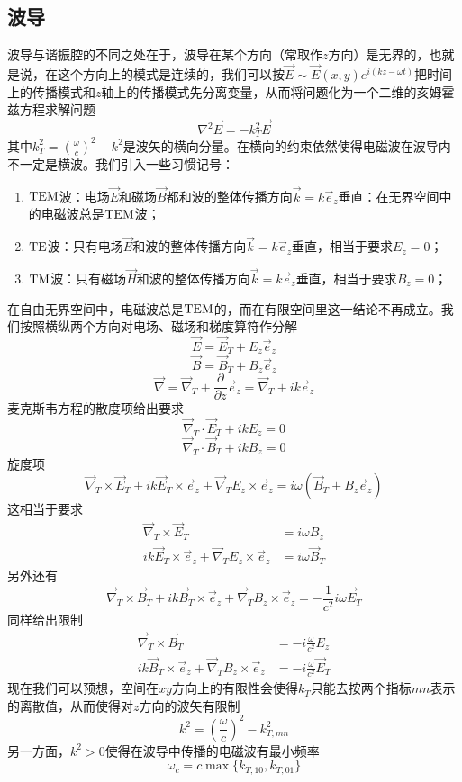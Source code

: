 \documentclass[a4paper,11pt]{ctexbook}
\newcommand{\beq}{\begin{equation}}
\newcommand{\eeq}{\end{equation}}
\newcommand{\bea}{\begin{equation}\begin{aligned}}
\newcommand{\eea}{\end{aligned}\end{equation}}
\newcommand{\del}{\vec{\nabla}}
\newcommand{\pfrac}[2]{\frac{\partial #1}{\partial #2}}
\begin{document}
\subsection{波导}
波导与谐振腔的不同之处在于，波导在某个方向（常取作$z$方向）是无界的，也就是说，在这个方向上的模式是连续的，我们可以按$\vec E \sim \vec E(x,y) e^{i(kz - \omega t)}$把时间上的传播模式和$z$轴上的传播模式先分离变量，从而将问题化为一个二维的亥姆霍兹方程求解问题
\beq
\nabla^2 \vec E = - k_T^2 \vec E
\eeq
其中$k_T^2 = \left(\frac{\omega}{c}\right)^2 - k^2$是波矢的横向分量。在横向的约束依然使得电磁波在波导内不一定是横波。我们引入一些习惯记号：
\begin{enumerate}
\item ${\rm TEM}$波：电场$\vec E$和磁场$\vec B$都和波的整体传播方向$\vec k = k \vec{e}_z$垂直：在无界空间中的电磁波总是${\rm TEM}$波；
\item ${\rm TE}$波：只有电场$\vec E$和波的整体传播方向$\vec k = k \vec{e}_z$垂直，相当于要求$E_z=0$；
\item ${\rm TM}$波：只有磁场$\vec H$和波的整体传播方向$\vec k = k \vec{e}_z$垂直，相当于要求$B_z=0$；
\end{enumerate}
在自由无界空间中，电磁波总是${\rm TEM}$的，而在有限空间里这一结论不再成立。我们按照横纵两个方向对电场、磁场和梯度算符作分解
\beq
\vec E = \vec{E}_T + E_z \vec{e}_z
\eeq
\beq
\vec B = \vec{B}_T + B_z \vec{e}_z
\eeq
\beq
\del = \del_T + \pfrac{}{z}\vec{e}_z = \del_T +ik\vec{e}_z
\eeq
麦克斯韦方程的散度项给出要求
\beq
\del_T \cdot \vec{E}_T +ikE_z = 0
\eeq
\beq
\del_T \cdot \vec{B}_T + ikB_z = 0
\eeq
旋度项
\beq
\del_T \times \vec{E}_T +ik\vec{E}_T \times \vec{e}_z + \del_T E_z \times \vec{e}_z = i\omega (\vec{B}_T + B_z \vec{e}_z)
\eeq
这相当于要求
\bea\label{wge}
\del_T \times \vec{E}_T&=i\omega B_z \\
ik\vec{E}_T \times \vec{e}_z + \del_T E_z \times \vec{e}_z&= i\omega \vec{B}_T
\eea
另外还有
\beq
\del_T \times \vec{B}_T +ik\vec{B}_T \times \vec{e}_z+ \del_T B_z \times \vec{e}_z =-\frac{1}{c^2} i\omega \vec{E}_T
\eeq
同样给出限制
\bea\label{wgb}
\del_T \times \vec{B}_T &= -i\frac{\omega}{c^2} E_z \\
ik\vec{B}_T \times \vec{e}_z + \del_T B_z \times \vec{e}_z&= -i\frac{\omega}{c^2} \vec{E}_T
\eea
现在我们可以预想，空间在$xy$方向上的有限性会使得$k_T$只能去按两个指标${mn}$表示的离散值，从而使得对$z$方向的波矢有限制
\beq
k^2 = \left(\frac{\omega}{c}\right)^2 - k_{T,mn}^2
\eeq
另一方面，$k^2>0$使得在波导中传播的电磁波有最小频率
\beq
\omega_{c} = c\max\{k_{T,10},k_{T,01}\}
\eeq
\end{document}
